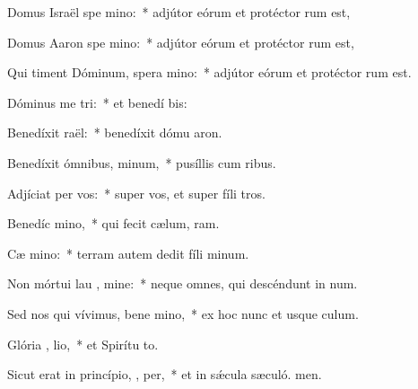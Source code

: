 \item Domus Israël spe  mino:~* adjútor eórum et protéctor rum est,
\item Domus Aaron spe  mino:~* adjútor eórum et protéctor rum est,
\item Qui timent Dóminum, spera  mino:~* adjútor eórum et protéctor rum est.
\item Dóminus me  tri:~* et benedí bis:
\item Benedíxit  raël:~* benedíxit dómu aron.
\item Benedíxit ómnibus,   minum,~* pusíllis cum ribus.
\item Adjíciat  per vos:~* super vos, et super fíli tros.
\item Benedíc   mino,~* qui fecit cælum,  ram.
\item Cæ  mino:~* terram autem dedit fíli minum.
\item Non mórtui lau , mine:~* neque omnes, qui descéndunt in num.
\item Sed nos qui vívimus, bene mino,~* ex hoc nunc et usque  culum.
\item Glória ,  lio,~* et Spirítu to.
\item Sicut erat in princípio,  ,  per,~* et in sǽcula sæculó. men.
